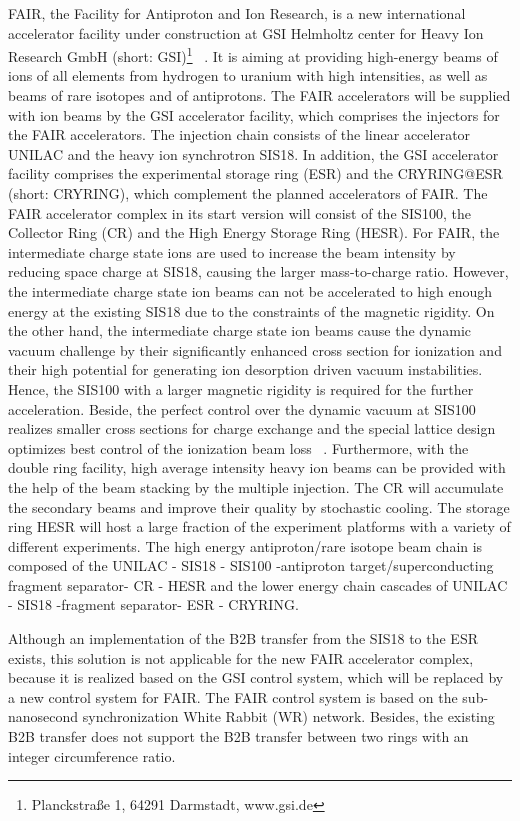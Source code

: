 FAIR, the Facility for Antiproton and Ion Research, is a new international accelerator facility under construction at GSI Helmholtz center for Heavy Ion Research GmbH (short: GSI)\footnote{Planckstra\ss{}e 1, 64291 Darmstadt, www.gsi.de} ~\cite{eschke_international_2005, noauthor_fair_2011}. It is aiming at providing high-energy beams of ions of all elements from hydrogen to uranium with high intensities, as well as beams of rare isotopes and of antiprotons.  The FAIR accelerators will be supplied with ion beams by the GSI accelerator facility, which comprises the injectors for the FAIR accelerators. The injection chain consists of the linear accelerator UNILAC and the heavy ion synchrotron SIS18. In addition, the GSI accelerator facility comprises the experimental storage ring (ESR) and the CRYRING@ESR (short: CRYRING), which complement the planned accelerators of FAIR. The FAIR accelerator complex in its start version will consist of the SIS100, the Collector Ring (CR) and the High Energy Storage Ring (HESR). For FAIR, the intermediate charge state ions are used to increase the beam intensity by reducing space charge at SIS18, causing the larger mass-to-charge ratio. However, the intermediate charge state ion beams can not be accelerated to high enough energy at the existing SIS18 due to the constraints of the magnetic rigidity. On the other hand, the intermediate charge state ion beams cause the dynamic vacuum challenge by their significantly enhanced cross section for ionization and their high potential for generating ion desorption driven vacuum instabilities. Hence, the SIS100 with a larger magnetic rigidity is required for the further acceleration. Beside, the perfect control over the dynamic vacuum at SIS100 realizes smaller cross sections for charge exchange and the special lattice design optimizes best control of the ionization beam loss ~\cite{spiller_technologies_2016}. Furthermore, with the double ring facility, high average intensity heavy ion beams can be provided with the help of the beam stacking by the multiple injection. The CR will accumulate the secondary beams and improve their quality by stochastic cooling. The storage ring HESR will host a large fraction
of the experiment platforms with a variety of different experiments. The high energy antiproton/rare isotope beam chain is composed of the UNILAC - SIS18 - SIS100 -antiproton target/superconducting fragment separator- CR - HESR and the lower energy chain cascades of UNILAC - SIS18 -fragment separator- ESR - CRYRING.

Although an implementation of the B2B transfer from the SIS18 to the ESR exists, this solution is not applicable for the new FAIR accelerator complex, because it is realized based on the GSI control system, which will be replaced by a new control system for FAIR. The FAIR control system is based on the sub-nanosecond synchronization White Rabbit (WR) network. Besides, the existing B2B transfer does not support the B2B transfer between two rings with an integer circumference ratio. 

